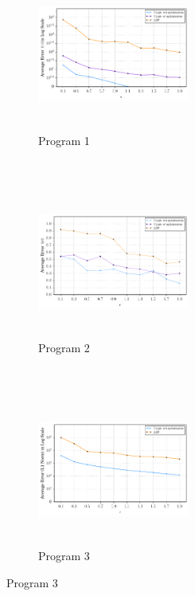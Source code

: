 \begin{figure}
    \centering
    \begin{subfigure}[b]{0.2\textwidth}
        \includegraphics[width=5cm,height=5cm]{test1_1.pdf}
        \caption{ Program 1}
        \label{fig:gull}
    \end{subfigure}\quad \qquad\quad 
    ~ %
    \begin{subfigure}[b]{0.3\textwidth}
       \qquad \includegraphics[width=5cm,height=5cm]{test22.pdf}
        \caption{ Program 2}
        \label{fig:tiger}
    \end{subfigure}
    ~ %
    \begin{subfigure}[b]{0.3\textwidth}
    \qquad    \includegraphics[width=5cm,height=5cm]{test33.pdf}
        \caption{Program 3}
        \label{fig:mouse}\end{subfigure}

\end{figure}

